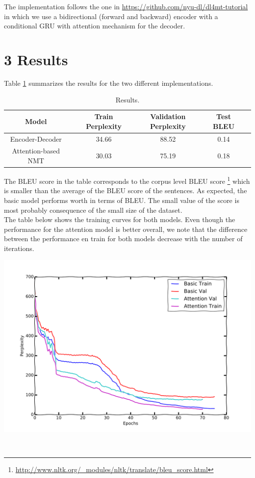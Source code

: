 \documentclass{article}
\begin{document}
The implementation follows the one in \url{https://github.com/nyu-dl/dl4mt-tutorial} in which we use a bidirectional (forward and backward) encoder with a conditional GRU with attention mechanism for the decoder. \\


{\section{3 Results}}

Table \ref{results1} summarizes the results for the two different implementations. 

\begin{table}[h]
\centering

\begin{tabular}{cccccc}

Model                 &\vline &  Train Perplexity  & Validation Perplexity & Test BLEU \\
\hline
\hline
Encoder-Decoder       &\vline &  34.66                 & 88.52                   & 0.14 \\
Attention-based NMT   &\vline &  30.03                 & 75.19                   & 0.18  \\

\end{tabular}
\caption{Results.}
\label{results1}
\end{table}

The BLEU score in the table corresponds to the corpus level BLEU score \footnote{\url{http://www.nltk.org/_modules/nltk/translate/bleu_score.html}} which is smaller than the average of the BLEU score of the sentences. As expected, the basic model performs worth in terms of BLEU. The small value of the score is most probably consequence of the small size of the dataset. \\

The table below shows the training curves for both models. Even though the performance for the attention model is better overall, we note that the difference between the performance en train for both models decrease with the number of iterations. 

\begin{center}\includegraphics[scale=0.6]{results}\label{plotresults}\end{center}\


\printbibliography
\end{document}
